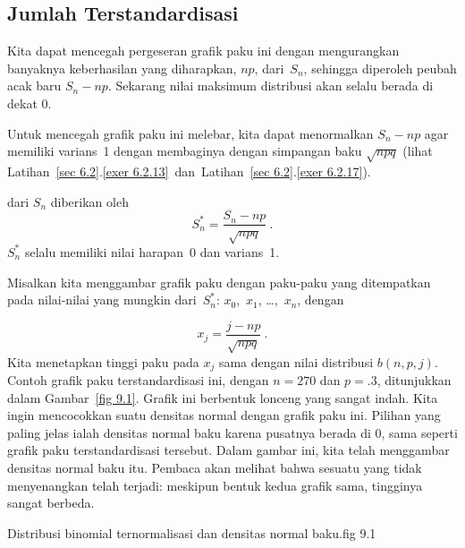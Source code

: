 \subsection*{Jumlah Terstandardisasi}
Kita dapat mencegah pergeseran grafik paku ini dengan mengurangkan banyaknya
keberhasilan yang diharapkan, $np$, dari~$S_n$, sehingga diperoleh peubah acak baru $S_n -
np$.  Sekarang nilai maksimum distribusi akan selalu berada di dekat 0.
\par
Untuk mencegah grafik paku ini melebar, kita dapat menormalkan $S_n - np$ agar
memiliki varians~1 dengan membaginya dengan simpangan baku $\sqrt{npq}$ (lihat
Latihan~\ref{sec 6.2}.\ref{exer 6.2.13}~dan~Latihan~\ref{sec 6.2}.\ref{exer 6.2.17}).

\begin{definition}
 dari $S_n$ diberikan oleh
\[
S_n^* = \frac {S_n - np}{\sqrt{npq}}\ .
\]
$S_n^*$ selalu memiliki nilai harapan~0 dan varians~1.
\end{definition}

Misalkan kita menggambar grafik paku dengan paku-paku yang ditempatkan pada nilai-nilai yang mungkin
dari~$S_n^*$: $x_0$,~$x_1$, \dots,~$x_n$, dengan

\begin{equation}
x_j = \frac {j - np}{\sqrt{npq}}\ .
\label{eq 9.1}
\end{equation}                                                        
Kita menetapkan tinggi paku pada $x_j$ sama dengan nilai distribusi $b(n, p, j)$.  Contoh
grafik paku terstandardisasi ini, dengan $n = 270$ dan $p = .3$, ditunjukkan dalam Gambar~\ref{fig 9.1}.
Grafik ini berbentuk lonceng yang sangat indah.  Kita ingin mencocokkan suatu densitas normal dengan
grafik paku ini.  Pilihan yang paling jelas ialah densitas normal baku karena pusatnya berada di
0, sama seperti grafik paku terstandardisasi tersebut.  Dalam gambar ini, kita telah menggambar densitas normal
baku itu.  Pembaca akan melihat bahwa sesuatu yang tidak menyenangkan telah terjadi: meskipun bentuk
kedua grafik sama, tingginya sangat berbeda.

{Distribusi binomial ternormalisasi dan densitas normal baku.}{fig 9.1} 

